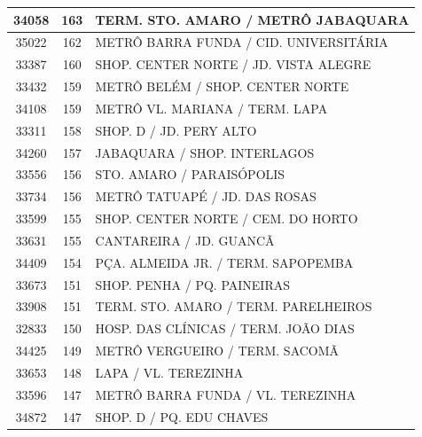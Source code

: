 \documentclass[
	12pt,				%
	oneside,			%
	a4paper,			%
	english,			%
	brazil				%
	]{abntex2ppgsi}
\begin{document}
{{\begin{apendicesenv}
\begin{longtable}{c|c|p{7cm}}
    34058 & 163   & TERM. STO. AMARO / METRÔ JABAQUARA \\
\hline

    35022 & 162   & METRÔ BARRA FUNDA / CID. UNIVERSITÁRIA \\
\hline

    33387 & 160   & SHOP. CENTER NORTE / JD. VISTA ALEGRE \\
\hline

    33432 & 159   & METRÔ BELÉM / SHOP. CENTER NORTE \\
\hline

    34108 & 159   & METRÔ VL. MARIANA / TERM. LAPA \\
\hline

    33311 & 158   & SHOP. D / JD. PERY ALTO \\
\hline

    34260 & 157   & JABAQUARA / SHOP. INTERLAGOS \\
\hline

    33556 & 156   & STO. AMARO / PARAISÓPOLIS \\
\hline

    33734 & 156   & METRÔ TATUAPÉ / JD. DAS ROSAS \\
\hline

    33599 & 155   & SHOP. CENTER NORTE / CEM. DO HORTO \\
\hline

    33631 & 155   & CANTAREIRA / JD. GUANCÃ \\
\hline

    34409 & 154   & PÇA. ALMEIDA JR. / TERM. SAPOPEMBA \\
\hline

    33673 & 151   & SHOP. PENHA / PQ. PAINEIRAS \\
\hline

    33908 & 151   & TERM. STO. AMARO / TERM. PARELHEIROS \\
\hline

    32833 & 150   & HOSP. DAS CLÍNICAS / TERM. JOÃO DIAS \\
\hline

    34425 & 149   & METRÔ VERGUEIRO / TERM. SACOMÃ \\
\hline

    33653 & 148   & LAPA / VL. TEREZINHA \\
\hline

    33596 & 147   & METRÔ BARRA FUNDA / VL. TEREZINHA \\
\hline

    34872 & 147   & SHOP. D / PQ. EDU CHAVES \\
\hline


\end{longtable}
\end{apendicesenv}}}
\end{document}
